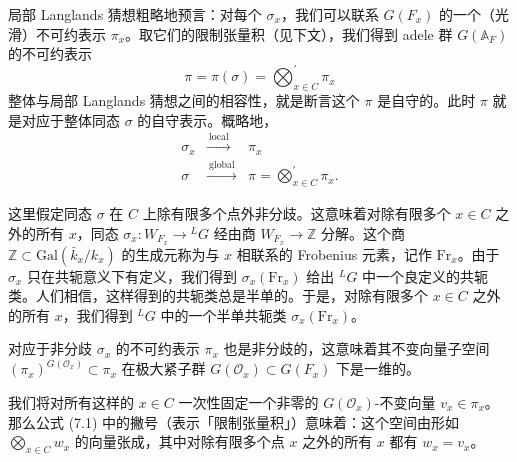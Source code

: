 局部 Langlands 猜想粗略地预言：对每个 $\sigma_x$，我们可以联系 $G(F_x)$ 的一个（光滑）不可约表示 $\pi_x$。取它们的限制张量积（见下文），我们得到 adele 群 $G(\mathbb{A}_F)$ 的不可约表示
\begin{equation}\tag{7.1}
\pi = \pi(\sigma) = \bigotimes_{x\in C}^{\prime}\pi_x
\end{equation}
整体与局部 Langlands 猜想之间的相容性，就是断言这个 $\pi$ 是自守的。此时 $\pi$ 就是对应于整体同态 $\sigma$ 的自守表示。概略地，
\[
\begin{array}{ccc}
\sigma_x & \xrightarrow{\ \text{local}\ } & \pi_x\\[3pt]
\sigma & \xrightarrow{\ \text{global}\ } & \pi = \bigotimes_{x\in C}^{\prime}\pi_x.
\end{array}
\]

这里假定同态 $\sigma$ 在 $C$ 上除有限多个点外非分歧。这意味着对除有限多个 $x\in C$ 之外的所有 $x$，同态 $\sigma_x: W_{F_x}\to{}^{L}G$ 经由商 $W_{F_x}\to\mathbb{Z}$ 分解。这个商 $\mathbb{Z}\subset\mathrm{Gal}(\bar k_x/k_x)$ 的生成元称为与 $x$ 相联系的 Frobenius 元素，记作 $\mathrm{Fr}_x$。由于 $\sigma_x$ 只在共轭意义下有定义，我们得到 $\sigma_x(\mathrm{Fr}_x)$ 给出 ${}^{L}G$ 中一个良定义的共轭类。人们相信，这样得到的共轭类总是半单的。于是，对除有限多个 $x\in C$ 之外的所有 $x$，我们得到 ${}^{L}G$ 中的一个半单共轭类 $\sigma_x(\mathrm{Fr}_x)$。

对应于非分歧 $\sigma_x$ 的不可约表示 $\pi_x$ 也是非分歧的，这意味着其不变向量子空间 $(\pi_x)^{G(\mathcal{O}_x)}\subset\pi_x$ 在极大紧子群 $G(\mathcal{O}_x)\subset G(F_x)$ 下是一维的。


我们将对所有这样的 $x\in C$ 一次性固定一个非零的 $G(\mathcal{O}_x)$-不变向量 $v_x\in\pi_x$。那么公式 (7.1) 中的撇号（表示「限制张量积」）意味着：这个空间由形如 $\bigotimes_{x\in C}w_x$ 的向量张成，其中对除有限多个点 $x$ 之外的所有 $x$ 都有 $w_x=v_x$。

